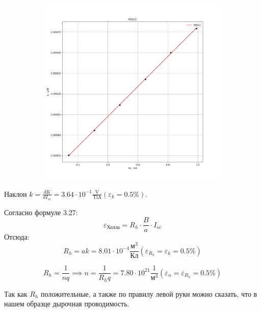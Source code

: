 \documentclass[a4paper, 12pt]{article}
\begin{document}
\begin{figure}[H]
    \centering
    \begin{subfigure}{1.\textwidth}
        \centering
        \includegraphics[width=1.\textwidth]{img/K(Isc).png}
    \end{subfigure}
\end{figure}

Наклон $k = \frac{dK}{dI_{sc}} = 3.64 \cdot 10^{-1}
\frac{\text{V}}{\text{TlA}} (\varepsilon_k = 0.5\%)$.

Согласно формуле 3.27:
\begin{equation}
    \varepsilon_\text{Холла} = R_h \cdot \frac{B}{a} \cdot I_{sc}
\end{equation}
Отсюда:
\begin{equation}
    R_h = ak = 8.01 \cdot 10^{-4} \frac{\text{м}^3}{\text{Кл}}
    (\varepsilon_{R_h} = \varepsilon_k = 0.5\%)
\end{equation}

\begin{equation}
    R_h = \frac{1}{nq} \implies n = \frac{1}{R_hq} = 7.80 \cdot 10^{21}
    \frac{1}{\text{м}^3}
    (\varepsilon_{n} = \varepsilon_{R_h} = 0.5\%)
\end{equation}

Так как $R_h$ положительные, а также по правилу левой руки можно сказать,
что в нашем образце дырочная проводимость.
\end{document}
